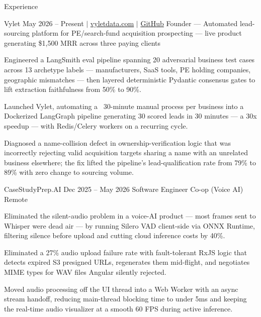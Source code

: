 \documentclass[
	11pt
]{../../../template}
\begin{document}
	\begin{rSection}{E}{xperience}
		\begin{rSectionEntry}
			{Vylet}
			{May 2026 -- Present $\vert$ \href{https://vyletdata.com}{vyletdata.com} $\vert$ \href{https://github.com/Verdent06/Lead-Gen-Agentic-Pipeline}{GitHub}}
			{Founder --- Automated lead-sourcing platform for PE/search-fund acquisition prospecting --- live product generating \$1,500 MRR across three paying clients}
			{}
			{}

			\item Engineered a LangSmith eval pipeline spanning 20 adversarial business test cases across 13 archetype labels --- manufacturers, SaaS tools, PE holding companies, geographic mismatches --- then layered deterministic Pydantic consensus gates to lift extraction faithfulness from 50\% to 90\%.
			\item Launched Vylet, automating a ~30-minute manual process per business into a Dockerized LangGraph pipeline generating 30 scored leads in 30 minutes --- a 30x speedup --- with Redis/Celery workers on a recurring cycle.
			\item Diagnosed a name-collision defect in ownership-verification logic that was incorrectly rejecting valid acquisition targets sharing a name with an unrelated business elsewhere; the fix lifted the pipeline's lead-qualification rate from 79\% to 89\% with zero change to sourcing volume.
		\end{rSectionEntry}

		\begin{rSectionEntry}
			{CaseStudyPrep.AI}
			{Dec 2025 -- May 2026}
			{Software Engineer Co-op (Voice AI)}
			{}
			{Remote}

			\item Eliminated the silent-audio problem in a voice-AI product --- most frames sent to Whisper were dead air --- by running Silero VAD client-side via ONNX Runtime, filtering silence before upload and cutting cloud inference costs by 40\%.
			\item Eliminated a 27\% audio upload failure rate with fault-tolerant RxJS logic that detects expired S3 presigned URLs, regenerates them mid-flight, and negotiates MIME types for WAV files Angular silently rejected.
			\item Moved audio processing off the UI thread into a Web Worker with an async stream handoff, reducing main-thread blocking time to under 5ms and keeping the real-time audio visualizer at a smooth 60 FPS during active inference.
		\end{rSectionEntry}


\end{rSection}
\end{document}
